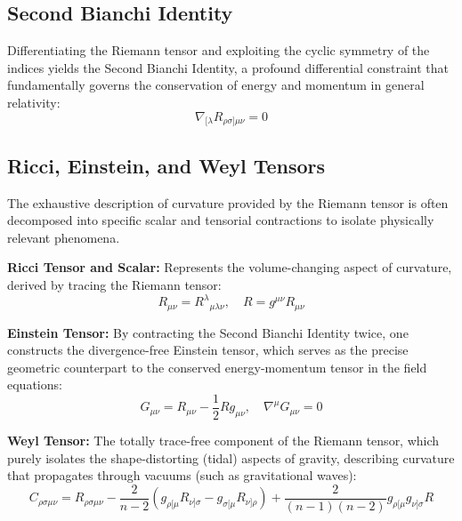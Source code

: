 \documentclass[11pt, a4paper]{report}
\begin{document}
\subsection*{Second Bianchi Identity}
Differentiating the Riemann tensor and exploiting the cyclic symmetry of the indices yields the Second Bianchi Identity, a profound differential constraint that fundamentally governs the conservation of energy and momentum in general relativity:
\begin{equation}
\nabla_{[\lambda} R_{\rho\sigma]\mu\nu} = 0
\end{equation}

\subsection*{Ricci, Einstein, and Weyl Tensors}
The exhaustive description of curvature provided by the Riemann tensor is often decomposed into specific scalar and tensorial contractions to isolate physically relevant phenomena.

\textbf{Ricci Tensor and Scalar:} Represents the volume-changing aspect of curvature, derived by tracing the Riemann tensor:
\begin{equation}
R_{\mu\nu} = {R^\lambda}_{\mu\lambda\nu}, \quad R = g^{\mu\nu} R_{\mu\nu}
\end{equation}

\textbf{Einstein Tensor:} By contracting the Second Bianchi Identity twice, one constructs the divergence-free Einstein tensor, which serves as the precise geometric counterpart to the conserved energy-momentum tensor in the field equations:
\begin{equation}
G_{\mu\nu} = R_{\mu\nu} - \frac{1}{2} R g_{\mu\nu}, \quad \nabla^\mu G_{\mu\nu} = 0
\end{equation}

\textbf{Weyl Tensor:} The totally trace-free component of the Riemann tensor, which purely isolates the shape-distorting (tidal) aspects of gravity, describing curvature that propagates through vacuums (such as gravitational waves):
\begin{equation}
C_{\rho\sigma\mu\nu} = R_{\rho\sigma\mu\nu} - \frac{2}{n-2} (g_{\rho[\mu} R_{\nu]\sigma} - g_{\sigma[\mu} R_{\nu]\rho}) + \frac{2}{(n-1)(n-2)} g_{\rho[\mu} g_{\nu]\sigma} R
\end{equation}
\end{document}

